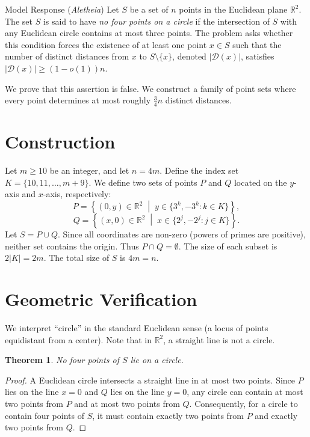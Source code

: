 \documentclass[11pt]{article}
\newtheorem{theorem}{Theorem}
\begin{document}
\begin{solution}{Model Response (\emph{Aletheia})}
    Let $S$ be a set of $n$ points in the Euclidean plane $\mathbb{R}^2$. The set $S$ is said to have \textit{no four points on a circle} if the intersection of $S$ with any Euclidean circle contains at most three points. The problem asks whether this condition forces the existence of at least one point $x \in S$ such that the number of distinct distances from $x$ to $S \setminus \{x\}$, denoted $|\mathcal{D}(x)|$, satisfies $|\mathcal{D}(x)| \ge (1-o(1))n$.

We prove that this assertion is false. We construct a family of point sets where every point determines at most roughly $\frac{3}{4}n$ distinct distances.

\section{Construction}

Let $m \ge 10$ be an integer, and let $n = 4m$. Define the index set $K = \{10, 11, \dots, m+9\}$.
We define two sets of points $P$ and $Q$ located on the $y$-axis and $x$-axis, respectively:
\[
P = \left\{ (0, y) \in \mathbb{R}^2 \;\middle|\; y \in \{ 3^k, -3^k : k \in K \} \right\},
\]
\[
Q = \left\{ (x, 0) \in \mathbb{R}^2 \;\middle|\; x \in \{ 2^j, -2^j : j \in K \} \right\}.
\]
Let $S = P \cup Q$.
Since all coordinates are non-zero (powers of primes are positive), neither set contains the origin. Thus $P \cap Q = \emptyset$.
The size of each subset is $2|K| = 2m$. The total size of $S$ is $4m = n$.

\section{Geometric Verification}

We interpret ``circle'' in the standard Euclidean sense (a locus of points equidistant from a center). Note that in $\mathbb{R}^2$, a straight line is not a circle.

\begin{theorem}
No four points of $S$ lie on a circle.
\end{theorem}

\begin{proof}
A Euclidean circle intersects a straight line in at most two points. Since $P$ lies on the line $x=0$ and $Q$ lies on the line $y=0$, any circle can contain at most two points from $P$ and at most two points from $Q$.
Consequently, for a circle to contain four points of $S$, it must contain exactly two points from $P$ and exactly two points from $Q$.


\end{proof}
\end{solution}
\end{document}
